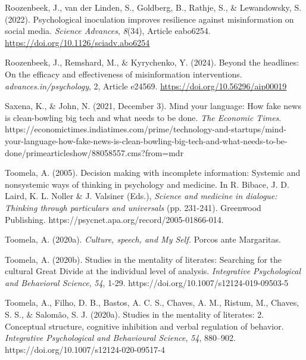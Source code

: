 \documentclass[authordate, empirical]{jote-new-article}
\begin{document}
	Roozenbeek, J., van der Linden, S., Goldberg, B., Rathje, S., \& Lewandowsky, S. (2022). Psychological inoculation improves resilience against misinformation on social media. \emph{Science Advances}, \emph{8}(34), Article eabo6254. \href{https://doi.org/10.1126/sciadv.abo6254}{\underline{https://doi.org/}}\href{https://doi.org/10.1126/sciadv.abo6254}{\underline{10.1126/sciadv.abo6254}}



	Roozenbeek, J., Remshard, M., \& Kyrychenko, Y. (2024). Beyond the headlines: On the efficacy and effectiveness of misinformation interventions. \emph{advances.in/psychology}, 2, Article e24569. \href{https://doi.org/10.56296/aip00019}{\underline{https://doi.org/10.56296/aip00019}}



	Saxena, K., \& John, N. (2021, December 3). Mind your language: How fake news is clean-bowling big tech and what needs to be done. \emph{The Economic Times}. https://economictimes.indiatimes.com/prime/technology-and-startups/mind-your-language-how-fake-news-is-clean-bowling-big-tech-and-what-needs-to-be-done/primearticleshow/88058557.cms?from=mdr



	Toomela, A. (2005). Decision making with incomplete information: Systemic and nonsystemic ways of thinking in psychology and medicine. In R. Bibace, J. D. Laird, K. L. Noller \& J. Valsiner (Eds.), \emph{Science and medicine in dialogue: Thinking through particulars and universals} (pp. 231-241). Greenwood Publishing. https://psycnet.apa.org/record/2005-01866-014.



	Toomela, A. (2020a). \emph{Culture, speech, and My Self. }Porcos ante Margaritas.



	Toomela, A. (2020b). Studies in the mentality of literates: Searching for the cultural Great Divide at the individual level of analysis. \emph{Integrative Psychological and Behavioral Science}, \emph{54}, 1-29. https://doi.org/10.1007/s12124-019-09503-5



	Toomela, A., Filho, D. B., Bastos, A. C. S., Chaves, A. M., Ristum, M., Chaves, S. S., \& Salomão, S. J. (2020a). Studies in the mentality of literates: 2. Conceptual structure, cognitive inhibition and verbal regulation of behavior. \emph{Integrative Psychological and Behavioural Science}, \emph{54}, 880--902. https://doi.org/10.1007/s12124-020-09517-4
\end{document}
